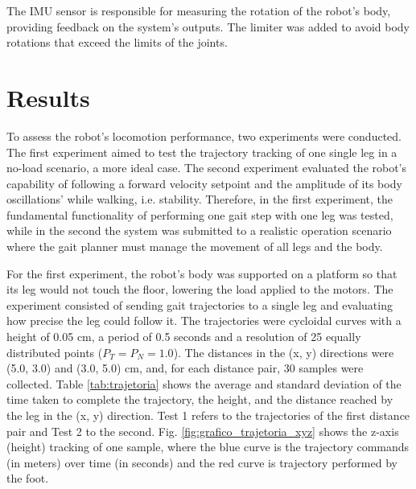 \documentclass[conference]{IEEEtran}
\begin{document}
The IMU sensor is responsible for measuring the rotation of the robot's body, providing feedback on the system's outputs. The limiter was added to avoid body rotations that exceed the limits of the joints.

\section{Results} \label{results}

To assess the robot's locomotion performance, two experiments were conducted. The first experiment aimed to test the trajectory tracking of one single leg in a no-load scenario, a more ideal case. The second experiment evaluated the robot's capability of following a forward velocity setpoint and the amplitude of its body oscillations' while walking, i.e. stability. Therefore, in the first experiment, the fundamental functionality of performing one gait step with one leg was tested, while in the second the system was submitted to a realistic operation scenario where the gait planner must manage the movement of all legs and the body.

For the first experiment, the robot's body was supported on a platform so that its leg would not touch the floor, lowering the load applied to the motors. The experiment consisted of sending gait trajectories to a single leg and evaluating how precise the leg could follow it. The trajectories were cycloidal curves with a height of 0.05 cm, a period of 0.5 seconds and a resolution of 25 equally distributed points ($P_T = P_N = 1.0$). The distances in the (x, y) directions were (5.0, 3.0) and (3.0, 5.0) cm, and, for each distance pair, 30 samples were collected. Table \ref{tab:trajetoria} shows the average and standard deviation of the time taken to complete the trajectory, the height, and the distance reached by the leg in the (x, y) direction. Test 1 refers to the trajectories of the first distance pair and Test 2 to the second. Fig. \ref{fig:grafico_trajetoria_xyz} shows the z-axis (height) tracking of one sample, where the blue curve is the trajectory commands (in meters) over time (in seconds) and the red curve is trajectory performed by the foot.
\end{document}
